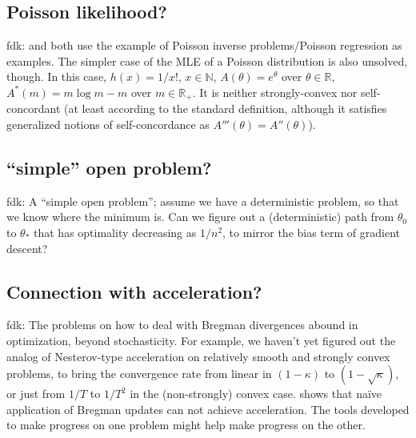 \documentclass[twoside]{article}
\newcommand{\fdk}[1]{\textcolor{Periwinkle}{fdk:#1}}
\newcommand{\m}{m}
\begin{document}
\subsection{Poisson likelihood?}
\fdk{
\citet{bauschke2017descent} and \citet{hanzely2018fastest} both use the example of Poisson inverse problems/Poisson regression
as examples. 
The simpler case of the MLE of a Poisson distribution is also unsolved, though. 
In this case, $h(x) = 1/x!$, $x \in \mathbb{N}$, $A(\theta) = e^\theta$ over $\theta \in \mathbb{R}$,
$A^*(\m) = \m \log \m - \m$ over $\m \in \mathbb{R}_+$.
It is neither strongly-convex nor self-concordant (at least according to the standard definition, 
although it satisfies generalized notions of self-concordance as $A'''(\theta) = A''(\theta)$).
}

\subsection{``simple'' open problem?}
\fdk{
A ``simple open problem'';
assume we have a deterministic problem, so that we know where the minimum is. 
Can we figure out a (deterministic) path from $\theta_0$ to $\theta_*$ 
that has optimality decreasing as $1/n^2$, 
to mirror the bias term of gradient descent?
}

\subsection{Connection with acceleration?}
\fdk{
The problems on how to deal with Bregman divergences abound in optimization, beyond stochasticity. 
For example, we haven't yet figured out the analog of Nesterov-type acceleration 
on relatively smooth and strongly convex problems, 
to bring the convergence rate from linear in $(1-\kappa)$ to $(1-\sqrt{\kappa})$, 
or just from $1/T$ to $1/T^2$ in the (non-strongly) convex case.
\citet{dragomir2021optimal}  shows that naïve application of Bregman updates can not achieve acceleration.
The tools developed to make progress on one problem might help make progress on the other. 
}










\newpage
\end{document}
